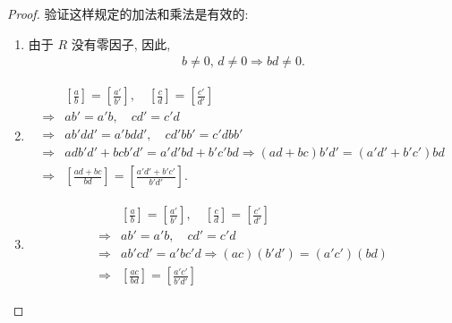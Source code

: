 \documentclass[utf8]{ctexbook}
\begin{document}
\begin{proof}
验证这样规定的加法和乘法是有效的:
\begin{enumerate}
\item{由于 $R$ 没有零因子, 因此, 
\begin{align*}
b \neq 0, \, d \neq 0 \Longrightarrow bd \neq 0 .
\end{align*}
}
\item{
\begin{align*}
& \left[ \frac{a}{b} \right] = \left[ \frac{a'}{b'} \right] , \quad \left[ \frac{c}{d} \right] = \left[ \frac{c'}{d'} \right] \\
\Longrightarrow & ab' = a' b, \quad cd' = c' d \\
\Longrightarrow & a b' d d' = a' b d d', \quad c d' bb' = c'd bb' \\
\Longrightarrow & a d b' d' + b c b' d' = a' d' b d + b' c' b d \Longrightarrow ( a d  + b c ) b' d' = (a' d'  + b' c') b d  \\
\Longrightarrow & \left[ \frac{a d  + b c }{b d} \right] =  \left[ \frac{a' d'  + b' c'}{b' d'} \right] .
\end{align*}
}
\item{
\begin{align*}
& \left[ \frac{a}{b} \right] = \left[ \frac{a'}{b'} \right] , \quad \left[ \frac{c}{d} \right] = \left[ \frac{c'}{d'} \right] \\
\Longrightarrow & ab' = a' b, \quad cd' = c' d \\
\Longrightarrow & ab' c d' = a'b c' d \Longrightarrow (ac)(b'd') = (a'c') (bd) \\
\Longrightarrow & \left[ \frac{a c }{b d} \right] =  \left[ \frac{a'  c'}{b' d'} \right]
\end{align*}
}
\end{enumerate}


\end{proof}
\end{document}
